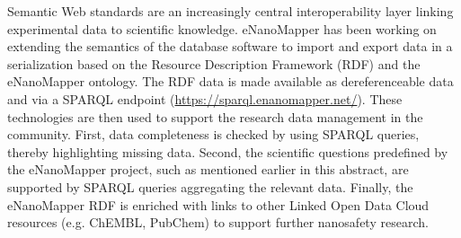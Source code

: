 \documentclass{llncs}
\begin{document}
Semantic Web standards are an increasingly central interoperability layer 
linking experimental data to scientific knowledge. eNanoMapper has been working 
on extending the semantics of the database software to import and export data in 
a serialization based on the Resource Description Framework (RDF) and the 
eNanoMapper ontology. The RDF data is made available as dereferenceable data and 
via a SPARQL endpoint (\url{https://sparql.enanomapper.net/}). These technologies 
are then used to support the research data management in the community. 
First, data completeness is checked by using SPARQL queries, thereby highlighting 
missing data. Second, the scientific questions predefined by the eNanoMapper project, 
such as mentioned earlier in this abstract, are supported by SPARQL queries 
aggregating the relevant data. Finally, the eNanoMapper RDF is enriched with links 
to other Linked Open Data Cloud resources (e.g. ChEMBL, PubChem) to support further 
nanosafety research.

{}

\end{document}
